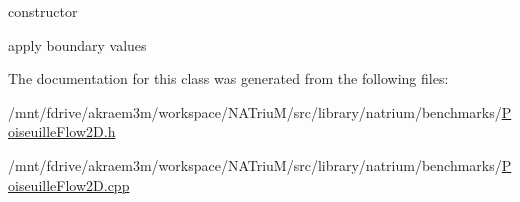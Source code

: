 constructor 

apply boundary values 

The documentation for this class was generated from the following files:\begin{DoxyCompactItemize}
\item 
/mnt/fdrive/akraem3m/workspace/NATriuM/src/library/natrium/benchmarks/\hyperlink{PoiseuilleFlow2D_8h}{PoiseuilleFlow2D.h}\item 
/mnt/fdrive/akraem3m/workspace/NATriuM/src/library/natrium/benchmarks/\hyperlink{PoiseuilleFlow2D_8cpp}{PoiseuilleFlow2D.cpp}\end{DoxyCompactItemize}
